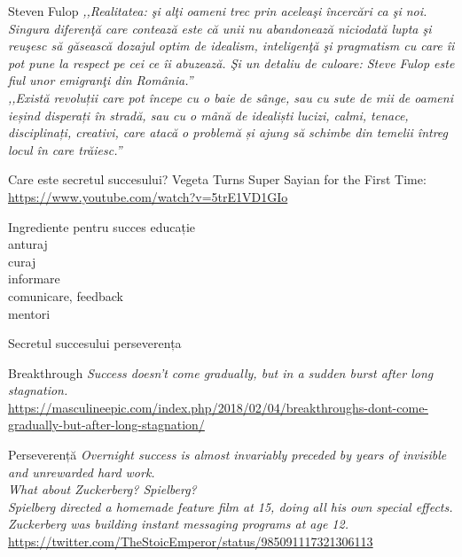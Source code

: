 \documentclass[handout]{beamer}
\begin{document}
\begin{frame}{Steven Fulop}
  \pause \textit{,,Realitatea: şi alţi oameni trec prin aceleaşi încercări ca şi noi. Singura diferenţă care contează este că unii nu abandonează niciodată lupta şi reuşesc să găsească dozajul optim de idealism, inteligenţă şi pragmatism cu care îi pot pune la respect pe cei ce îi abuzează. Şi un detaliu de culoare: Steve Fulop este fiul unor emigranţi din România.''} \\
  \pause \textit{,,Există revoluții care pot începe cu o baie de sânge, sau cu sute de mii de oameni ieșind disperați în stradă, sau cu o mână de idealiști lucizi, calmi, tenace, disciplinați, creativi, care atacă o problemă și ajung să schimbe din temelii întreg locul în care trăiesc.''}
\end{frame}

\begin{frame}{Care este secretul succesului?}
  \centering
  Vegeta Turns Super Sayian for the First Time: \url{https://www.youtube.com/watch?v=5trE1VD1GIo}
\end{frame}

\begin{frame}{Ingrediente pentru succes}
  \centering
  \pause educație \\
  \pause anturaj \\
  \pause curaj \\
  \pause informare \\
  \pause comunicare, feedback \\
  \pause mentori
\end{frame}

\begin{frame}{Secretul succesului}
  \centering
  \pause \Large{perseverența}
\end{frame}

\begin{frame}{Breakthrough}
  \centering
  \textit{Success doesn't come gradually, but in a sudden burst after long stagnation.}\\
  \vspace{3mm}
  \tiny{\url{https://masculineepic.com/index.php/2018/02/04/breakthroughs-dont-come-gradually-but-after-long-stagnation/}}
\end{frame}

\begin{frame}{Perseverență}
  \centering
  \textit{Overnight success is almost invariably preceded by years of invisible and unrewarded hard work.}\\
  \vspace{2mm}
  \textit{What about Zuckerberg? Spielberg?}\\
  \vspace{2mm}
  \textit{Spielberg directed a homemade feature film at 15, doing all his own special effects.}\\
  \vspace{2mm}
  \textit{Zuckerberg was building instant messaging programs at age 12.}\\
  \vspace{3mm}
  \tiny{\url{https://twitter.com/TheStoicEmperor/status/985091117321306113}}
\end{frame}
\end{document}
